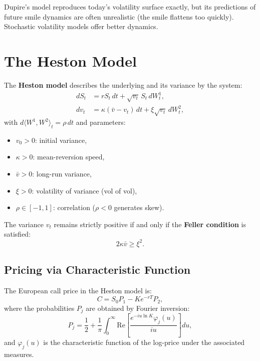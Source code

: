 \begin{warning}[title=\textbf{Limitations of Local Volatility}]
Dupire's model reproduces today's volatility surface exactly, but its
predictions of future smile dynamics are often unrealistic (the smile
flattens too quickly). Stochastic volatility models offer better dynamics.
\end{warning}

\section{The Heston Model}

\begin{definition}
The \textbf{Heston model} describes the underlying and its variance by
the system:
\begin{align}
    dS_t &= rS_t\,dt + \sqrt{v_t}\,S_t\,dW_t^1, \\
    dv_t &= \kappa(\bar{v} - v_t)\,dt + \xi\sqrt{v_t}\,dW_t^2,
\end{align}
with $d\langle W^1, W^2\rangle_t = \rho\,dt$ and parameters:
\begin{itemize}
    \item $v_0 > 0$: initial variance,
    \item $\kappa > 0$: mean-reversion speed,
    \item $\bar{v} > 0$: long-run variance,
    \item $\xi > 0$: volatility of variance (vol of vol),
    \item $\rho \in [-1,1]$: correlation ($\rho < 0$ generates skew).
\end{itemize}
\end{definition}

\begin{theorem}
The variance $v_t$ remains strictly positive if and only if the
\textbf{Feller condition} is satisfied:
\[
    2\kappa\bar{v} \geq \xi^2.
\]
\end{theorem}

\subsection{Pricing via Characteristic Function}

\begin{theorem}
The European call price in the Heston model is:
\[
    C = S_0 P_1 - Ke^{-rT}P_2,
\]
where the probabilities $P_j$ are obtained by Fourier inversion:
\[
    P_j = \frac{1}{2} + \frac{1}{\pi}\int_0^\infty
    \text{Re}\!\left[\frac{e^{-iu\ln K}\varphi_j(u)}{iu}\right]du,
\]
and $\varphi_j(u)$ is the characteristic function of the log-price under
the associated measures.
\end{theorem}

